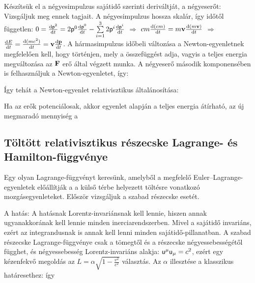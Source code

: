    Készítsük el a négyesimpulzus sajátidő szerinti deriváltját, a négyeserőt:
   Vizsgáljuk meg ennek tagjait. A négyesimpulzus hossza skalár, így időtől független: $0=\frac{\mathrm{d} \mathsf{p}^2}{\mathrm{d} t}=2\mathsf{p}^0\frac{\mathrm{d} \mathsf{p}^0}{\mathrm{d} t}-\sum\limits_{i=1}^{3}2\mathsf{p}^i\frac{\mathrm{d} \mathsf{p}^i}{\mathrm{d} t}$ $\Rightarrow$ $cm\frac{\mathrm{d} (cm)}{\mathrm{d} t}=m\mathbf{v}\frac{\mathrm{d} (m\mathbf{v})}{\mathrm{d} t}$ $\Rightarrow$ $\frac{\mathrm{d} E}{\mathrm{d} t}=\frac{\mathrm{d} (mc^2)}{\mathrm{d} t}=\mathbf{v}\frac{\mathrm{d} \mathbf{p}}{\mathrm{d} t}$.
   A hármasimpulzus időbeli változása a Newton-egyenletnek megfelelően kell, hogy történjen, mely a 
   összefüggést adja, vagyis a teljes energia megváltozása az $\mathbf{F}$ erő által végzett munka. A négyeserő második komponensében is felhasználjuk a Newton-egyenletet, így:
   
   Így tehát a Newton-egyenlet relativisztikus általánosítása:
   
   Ha az erők potenciálosak, akkor  egyenlet alapján a teljes energia átírható, az új megmaradó mennyiség a 
  
  \subsection{Töltött relativisztikus részecske Lagrange- és Hamilton-függvénye}\label{ss:02-relqLagrangeHamilton}
   
   Egy olyan Lagrange-függvényt keresünk, amelyből a megfelelő Euler--Lagrange-egyenletek előállítják a a külső térbe helyezett töltésre vonatkozó mozgásegyenleteket. Először vizsgáljuk a szabad részecske esetét. 
   
   A hatás:
   A hatásnak Lorentz-invariánsnak kell lennie, hiszen annak ugyanakkorának kell lennie minden inerciarendszerben. Mivel a sajátidő invariáns, ezért az integrandusnak is annak kell lenni minden sajátidő-pillanatban. A szabad részecske Lagrange-függvénye csak a tömegtől és a részecske négyessebességétől függhet, és négyessebesség Lorentz-invariáns alakja: $\mathsf{u}^\mu\mathsf{u}_\mu=c^2$, ezért egy kézenfekvő megoldás az $L=\alpha\sqrt{1-\frac{v^2}{c^2}}$ választás. Az $\alpha$ illesztése a klasszikus határesethez:
   így
   
